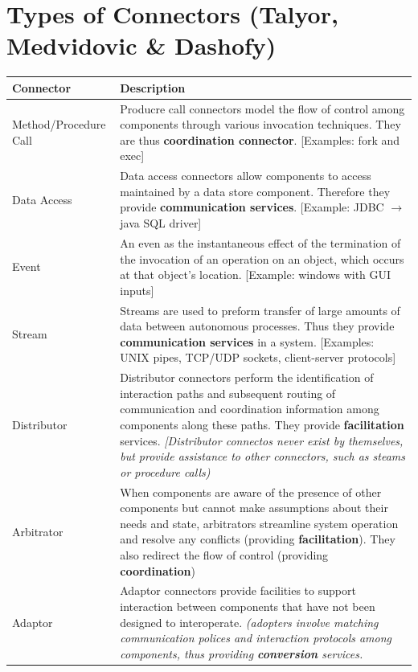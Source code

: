 \documentclass[a4paper]{report}
\begin{document}
\section{Types of Connectors (Talyor, Medvidovic \& Dashofy)}
\begin{table}[H]
\begin{tabular}{|l|p{10cm}|}
\hline
Connector & Description\\
\hline
Method/Procedure Call & Producre call connectors model the flow of control among components through various invocation techniques. They are thus \textbf{coordination connector}. [Examples: fork and exec]\\
\hline
Data Access & Data access connectors allow components to access maintained by a data store component. Therefore they provide \textbf{communication services}. [Example: JDBC $\rightarrow$ java SQL driver]\\
\hline
Event & An even as the instantaneous effect of the termination of the invocation of an operation on an object, which occurs at that object's location. [Example: windows with GUI inputs] \\
\hline
Stream & Streams are used to preform transfer of large amounts of data between autonomous processes. Thus they provide \textbf{communication services} in a system. [Examples: UNIX pipes, TCP/UDP sockets, client-server protocols]\\
\hline
Distributor & Distributor connectors perform the identification of interaction paths and subsequent routing of communication and coordination information among components along these paths. They provide \textbf{facilitation} services. \textit{[Distributor connectos never exist by themselves, but provide assistance to other connectors, such as steams or procedure calls)}\\
\hline
Arbitrator & When components are aware of the presence of other components but cannot make assumptions about their needs and state, arbitrators streamline system operation and resolve any conflicts (providing \textbf{facilitation}). They also redirect the flow of control (providing \textbf{coordination}) \\
\hline
Adaptor & Adaptor connectors provide facilities to support interaction between components that have not been designed to interoperate. \textit{(adopters involve matching communication polices and interaction protocols among components, thus providing \textbf{conversion} services.}\\
\hline
\end{tabular}
\end{table}
\end{document}

